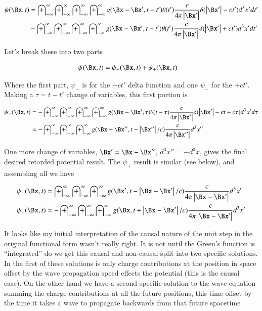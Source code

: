 \documentclass{article}
\newcommand{\IIinf}[0]{ \int_{-\infty}^\infty }
\begin{document}
\begin{align*}
{\psi}(\Bx, t)
&=
\IIinf \IIinf \IIinf \IIinf g(\Bx - \Bx', t - t') \theta(t') \frac{c }{4\pi \Abs{\Bx'}} \delta(\Abs{\Bx'} - c t') d^3 x' dt' \\
&-\IIinf \IIinf \IIinf \IIinf g(\Bx - \Bx', t - t') \theta(t') \frac{c }{4\pi \Abs{\Bx'}} \delta(\Abs{\Bx'} + c t') d^3 x' dt' \\
\end{align*}

Let's break these into two parts

\begin{align}\label{eqn:almostThere}
{\psi}(\Bx, t) &= {\psi}_{-}(\Bx, t) +{\psi}_{+}(\Bx, t)
\end{align}

Where the first part, $\psi_{-}$ is for the $-ct'$ delta function and one $\psi_{-}$ for the $+ct'$.
Making a $\tau = t-t'$ change of variables, this first portion is

\begin{align*}
{\psi}_{-}(\Bx, t)
&= -\IIinf \IIinf \IIinf \IIinf g(\Bx - \Bx', \tau) \theta(t-\tau) \frac{c }{4\pi \Abs{\Bx'}} \delta(\Abs{\Bx'} - c t + c\tau) d^3 x' d\tau \\
&= -\IIinf \IIinf \IIinf g(\Bx - \Bx'', t - \Abs{\Bx''}/c) \frac{c }{4\pi \Abs{\Bx''}} d^3 x'' \\
\end{align*}

One more change of variables, $\Bx' = \Bx - \Bx''$, $d^3 x'' = -d^3 x$, gives the final desired retarded potential result.  The $\psi_{+}$ result is similar (see below), and assembling all we have

\begin{align}
{\psi}_{-}(\Bx, t) &= \IIinf \IIinf \IIinf g(\Bx', t - \Abs{\Bx - \Bx'}/c) \frac{c }{4\pi \Abs{\Bx - \Bx'}} d^3 x' \\
{\psi}_{+}(\Bx, t) &= -\IIinf \IIinf \IIinf g(\Bx, t + \Abs{\Bx -\Bx'}/c) \frac{c }{4\pi \Abs{\Bx -\Bx'}} d^3 x'
\end{align}

It looks like my initial interpretation of the causal nature of the unit step in the original functional form wasn't really right.  It is not
until the Green's function is ``integrated'' do we get this causal and non-causal split into two specific solutions.
In the first of these solutions is only charge contributions at the position in space offset by the wave propagation speed effects the
potential (this is the causal case).  On the other hand we have a second specific solution to the wave equation
summing the charge contributions at all the future positions, this time offset by the time it takes a wave to propagate backwards from that future spacetime
\end{document}
